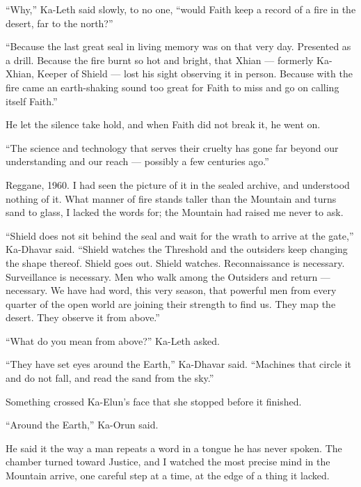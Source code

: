 ``Why,'' Ka-Leth said slowly, to no one, ``would Faith keep a record of a fire in the desert, far to the north?''\par
 
``Because the last great seal in living memory was on that very day. 
Presented as a drill. 
Because the fire burnt so hot and bright, that Xhian --- formerly Ka-Xhian, Keeper of Shield --- lost his sight observing it in person.
Because with the fire came an earth-shaking sound too great for Faith to miss and go on calling itself Faith.''

He let the silence take hold, and when Faith did not break it, he went on.

``The science and technology that serves their cruelty has gone far beyond our understanding and our reach --- possibly a few centuries ago.''\par

Reggane, 1960. I had seen the picture of it in the sealed archive, and understood nothing of it. What manner of fire stands taller than the Mountain and turns sand to glass, I lacked the words for; the Mountain had raised me never to ask.\par
 
``Shield does not sit behind the seal and wait for the wrath to arrive at the gate,'' Ka-Dhavar said. 
``Shield watches the Threshold and the outsiders keep changing the shape thereof.
Shield goes out. Shield watches. Reconnaissance is necessary. Surveillance is necessary. 
Men who walk among the Outsiders and return --- necessary. We have had word, this very season, 
that powerful men from every quarter of the open world are joining their strength to find us. 
They map the desert. They observe it from above.''\par
 
``What do you mean from above?'' Ka-Leth asked. \par
 
``They have set eyes around the Earth,'' Ka-Dhavar said. ``Machines that circle it and do not fall, and read the sand from the sky.'' 
 
Something crossed Ka-Elun's face that she stopped before it finished.\par

\ornament
 
``Around the Earth,'' Ka-Orun said.\par
 
He said it the way a man repeats a word in a tongue he has never spoken. The chamber turned toward Justice, and I watched the most precise mind in the Mountain arrive, one careful step at a time, at the edge of a thing it lacked.\par
 

